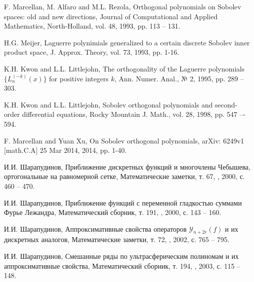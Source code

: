 \begin{thebibliography}{999}

F. Marcellan, M. Alfaro and M.L. Rezola,
Orthogonal polynomials on Sobolev spaces: old and new directions,
Journal of Computational and Applied Mathematics, North-Holland, vol. 48, 1993, pp. 113 -- 131.





H.G. Meijer,
Laguerre polynimials generalized to a certain discrete Sobolev inner product space,
J. Approx. Theory, vol. 73, 1993, pp. 1-16.




K.H. Kwon and L.L. Littlejohn,
The orthogonality of the Laguerre polynomials $\{L_n^{(-k)}(x)\}$ for positive integers $k$,
Ann. Numer. Anal., № 2, 1995, pp. 289 -- 303.



 K.H. Kwon and L.L. Littlejohn,
Sobolev orthogonal polynomials and second-order differential equations, Rocky Mountain J. Math.,
vol. 28, 1998, pp. 547 –- 594.



F. Marcellan and Yuan Xu,
On Sobolev orthogonal polynomials,
arXiv: 6249v1 [math.C.A] 25 Mar 2014, 2014, pp. 1-40.



 И.И. Шарапудинов,
Приближение дискретных функций и многочлены Чебышева, ортогональные на равномерной сетке,
Математические заметки, т. 67, , 2000, с. 460 -- 470.



И.И. Шарапудинов,
Приближение функций с переменной гладкостью суммами Фурье Лежандра,
Математический сборник, т. 191, , 2000, с. 143 -- 160.




И.И. Шарапудинов,
Аппроксимативные свойства операторов $\mathcal{Y}_{n+2r}(f)$ и их дискретных аналогов,
Математические заметки, т. 72, , 2002, с. 765 -- 795.



И.И. Шарапудинов,
Смешанные ряды по ультрасферическим полиномам и их аппроксимативные свойства,
Математический сборник, т. 194, , 2003, с. 115 -- 148.



\end{thebibliography}
